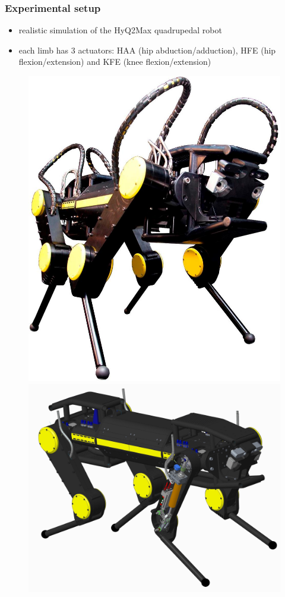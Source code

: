 \documentclass[11pt]{beamer}
\begin{document}
\begin{frame}\frametitle{\color{black} Experimental setup}

  \begin{itemize}\small
  \item realistic simulation of the HyQ2Max quadrupedal robot
  \item each limb has 3 actuators: HAA (hip abduction/adduction), HFE (hip 
flexion/extension) and KFE (knee flexion/extension)
 \end{itemize}
  \vspace*{-5mm}
 \begin{figure}
  \centering
  \includegraphics[scale=.34]{hyq2max_whiteBG.jpg}
  \hspace*{7mm}
  \includegraphics[scale=.03]{hyq2max_cad.jpg}

\end{figure}
\end{frame}
\end{document}
